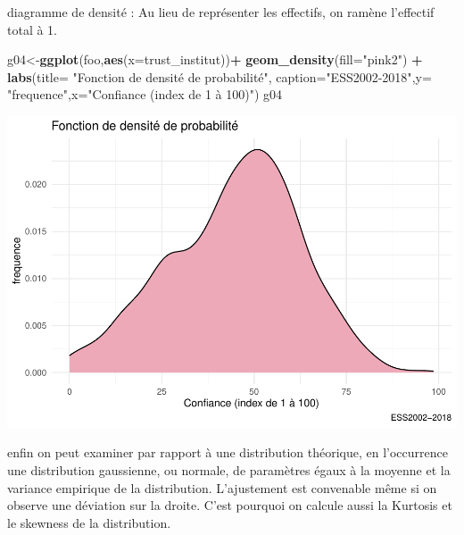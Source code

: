 \documentclass[
]{book}
\newenvironment{Shaded}{\begin{snugshade}}{\end{snugshade}}
\newcommand{\DataTypeTok}[1]{\textcolor[rgb]{0.13,0.29,0.53}{#1}}
\newcommand{\KeywordTok}[1]{\textcolor[rgb]{0.13,0.29,0.53}{\textbf{#1}}}
\newcommand{\NormalTok}[1]{#1}
\newcommand{\OperatorTok}[1]{\textcolor[rgb]{0.81,0.36,0.00}{\textbf{#1}}}
\newcommand{\StringTok}[1]{\textcolor[rgb]{0.31,0.60,0.02}{#1}}
\begin{document}
diagramme de densité : Au lieu de représenter les effectifs, on ramène l'effectif total à 1.

\begin{Shaded}
\begin{Highlighting}[]
\NormalTok{g04<-}\KeywordTok{ggplot}\NormalTok{(foo,}\KeywordTok{aes}\NormalTok{(}\DataTypeTok{x=}\NormalTok{trust_institut))}\OperatorTok{+}\StringTok{ }
\StringTok{  }\KeywordTok{geom_density}\NormalTok{(}\DataTypeTok{fill=}\StringTok{"pink2"}\NormalTok{) }\OperatorTok{+}
\StringTok{  }\KeywordTok{labs}\NormalTok{(}\DataTypeTok{title=} \StringTok{"Fonction de densité de probabilité"}\NormalTok{, }\DataTypeTok{caption=}\StringTok{"ESS2002-2018"}\NormalTok{,}\DataTypeTok{y=} \StringTok{"frequence"}\NormalTok{,}\DataTypeTok{x=}\StringTok{"Confiance (index de 1 à 100)"}\NormalTok{) }
\NormalTok{g04}
\end{Highlighting}
\end{Shaded}

\includegraphics{bookdown-demo_files/figure-latex/304-1.pdf}

enfin on peut examiner par rapport à une distribution théorique, en l'occurrence une distribution gaussienne, ou normale, de paramètres égaux à la moyenne et la variance empirique de la distribution. L'ajustement est convenable même si on observe une déviation sur la droite. C'est pourquoi on calcule aussi la Kurtosis et le skewness de la distribution.
\end{document}
